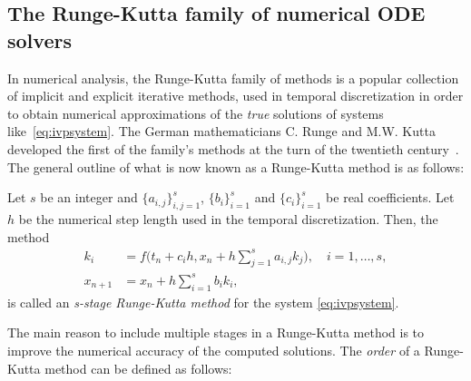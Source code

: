 \subsection{The Runge-Kutta family of numerical ODE solvers}
\label{sub:the_runge_kutta_family_of_numerical_ode_solvers}

In numerical analysis, the Runge-Kutta family of methods is a popular collection
of implicit and explicit iterative methods, used in temporal discretization in
order to obtain numerical approximations of the \emph{true} solutions of systems
like~\eqref{eq:ivpsystem}. The German mathematicians C. Runge and M.W. Kutta
developed the first of the family's methods at the turn of the twentieth
century~\parencite[p.134]{hairer1993solving}. The general outline of what
is now known as a Runge-Kutta method is as follows:

\begin{defn}
    \label{def:runge_kutta_methods}
    Let $s$ be an integer and $\{a_{i,j}\}_{i,j=1}^{s}$, %
    $\{b_{i}\}_{i=1}^{s}$ and $\{c_{i}\}_{i=1}^{s}$ be real coefficients.%
    \hfill\newline
    Let $h$ be the numerical step length used in the temporal discretization.%
    \hfill\newline
    Then, the method
    \begin{equation}
        \label{eq:generalrungekutta}
        \begin{aligned}
        k_{i} &= f\bigg(t_{n} + c_{i}h, x_{n} + %
        h\sum\limits_{j=1}^{s}a_{i,j}k_{j}\bigg), \quad{}i=1,\ldots,s,\\
        x_{n+1} &= x_{n} + h\sum\limits_{i=1}^{s}b_{i}k_{i},
        \end{aligned}
    \end{equation}
    is called an \emph{s-stage Runge-Kutta method} for the system
    \eqref{eq:ivpsystem}.
\end{defn}

The main reason to include multiple stages in a Runge-Kutta method is to
improve the numerical accuracy of the computed solutions. The \emph{order} of a
Runge-Kutta method can be defined as follows:

